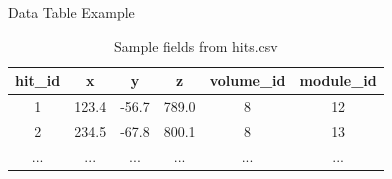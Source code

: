 \documentclass{beamer}
\begin{document}
\begin{frame}{Data Table Example}
  \begin{table}[]
    \centering
    \begin{tabular}{cccccc}
      \hline
      hit\_id & x & y & z & volume\_id & module\_id \\
      \hline
      1 & 123.4 & -56.7 & 789.0 & 8 & 12 \\
      2 & 234.5 & -67.8 & 800.1 & 8 & 13 \\
      ... & ... & ... & ... & ... & ... \\
      \hline
    \end{tabular}
    \caption{Sample fields from hits.csv}
  \end{table}
\end{frame}
\end{document}
